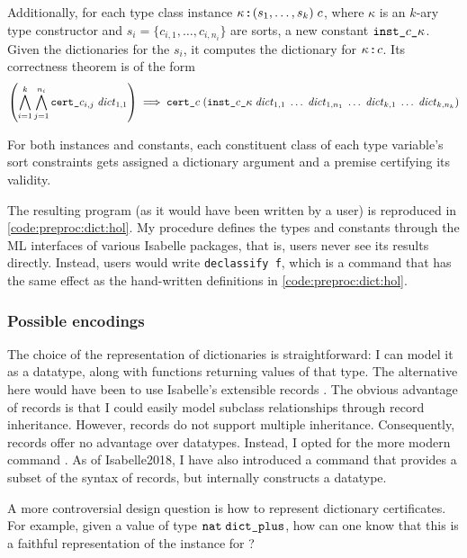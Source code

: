 Additionally, for each type class instance $\kappa \mathbin{:\!\!:} (s_1, \ldots, s_k)\;c$, where $\kappa$ is an $k$-ary type constructor and $s_i = \{c_{i,1}, \ldots, c_{i,n_i}\}$ are sorts, a new constant $\texttt{\textup{inst\_}}c\texttt{\textup{\_}}\kappa$.
Given the dictionaries for the $s_i$, it computes the dictionary for $\kappa \mathbin{:\!\!:} c$.
Its correctness theorem is of the form
\[
  \left(\bigwedge\limits_{i=1}^{k} \bigwedge\limits_{j=1}^{n_i} \texttt{\textup{cert\_}}c_{i,j}\;\mathit{dict}_{1,1}\right) \implies \texttt{\textup{cert\_}}c\;(\texttt{\textup{inst\_}}c\texttt{\textup{\_}}\kappa\;\mathit{dict}_{1,1}\;\ldots\;\mathit{dict}_{1,n_1}\;\ldots\;\mathit{dict}_{k,1}\;\ldots\;\mathit{dict}_{k,n_k})
\]

\noindent For both instances and constants, each constituent class of each type variable's sort constraints gets assigned a dictionary argument and a premise certifying its validity.

The resulting program (as it would have been written by a user) is reproduced in \cref{code:preproc:dict:hol}.
My procedure defines the types and constants through the ML interfaces of various Isabelle packages, that is, users never see its results directly.
Instead, users would write \lstinline~declassify f~, which is a command that has the same effect as the hand-written definitions in \cref{code:preproc:dict:hol}.

\subsubsection{Possible encodings}
\label{sec:preproc:dict:elim:encoding}

The choice of the representation of dictionaries is straightforward:
I can model it as a datatype, along with functions returning values of that type.
The alternative here would have been to use Isabelle's extensible records \cite{naraschewski1998record}.
The obvious advantage of records is that I could easily model subclass relationships through record inheritance.
However, records do not support multiple inheritance.
Consequently, records offer no advantage over datatypes.
Instead, I opted for the more modern  command \cite{blanchette2014datatypes}.
As of Isabelle2018, I have also introduced a  command that provides a subset of the syntax of records, but internally constructs a datatype.%

A more controversial design question is how to represent dictionary certificates.
For example, given a value of type $\texttt{\textup{nat}}\;\texttt{\textup{dict\_plus}}$, how can one know that this is a faithful representation of the  instance for ?

